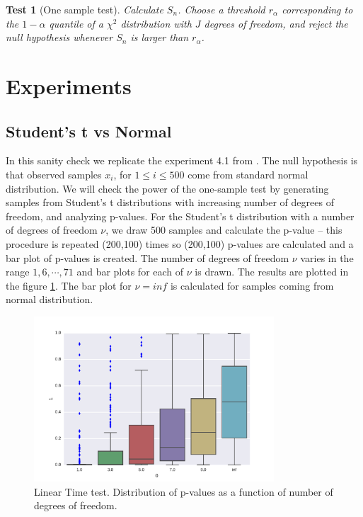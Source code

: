 \documentclass{article}
\newtheorem{test}{Test}
\begin{document}
\begin{test}[One sample test]
\label{test}
Calculate $S_n$. Choose a threshold $r_\alpha$ corresponding to the $1-\alpha$ quantile of a  $\chi^2$ distribution with $J$ degrees of freedom, and reject the null hypothesis whenever $S_n$ is larger than $r_\alpha$. 
\end{test}

\section{Experiments}

\subsection{Student's t vs Normal}
In this  sanity check we replicate the experiment 4.1 from \cite{gorham2015measuring}. The null hypothesis is that observed samples $x_i$, for $1 \leq i \leq 500$ come from standard normal distribution. We will check the power of the one-sample test by generating samples from Student's t distributions with increasing number of degrees of freedom, and analyzing p-values. For the Student's t distribution with a number of degrees of freedom $\nu$, we draw 500 samples and calculate the p-value -- this procedure is repeated (200,100) times so (200,100) p-values are calculated and a bar plot of p-values is created. The number of degrees of freedom $\nu$ varies in the range $1,6,\cdots,71$ and bar plots for each of $\nu$ is drawn.  The results are plotted in the figure \ref{fig:studentst}. The bar plot for $\nu = inf$ is calculated for samples coming from normal distribution.

\begin{figure}
\label{fig:studentst}
\includegraphics[width=0.8\textwidth]{./img/student.pdf}
\caption{Linear Time test. Distribution of p-values as a function of number of degrees of freedom.}
\end{figure}
\end{document}
